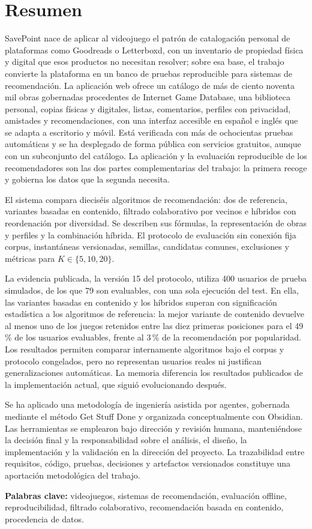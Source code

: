 \chapter*{Resumen}

SavePoint nace de aplicar al videojuego el patrón de catalogación personal de plataformas como Goodreads o Letterboxd, con un inventario de propiedad física y digital que esos productos no necesitan resolver; sobre esa base, el trabajo convierte la plataforma en un banco de pruebas reproducible para sistemas de recomendación. La aplicación web ofrece un catálogo de más de ciento noventa mil obras gobernadas procedentes de Internet Game Database, una biblioteca personal, copias físicas y digitales, listas, comentarios, perfiles con privacidad, amistades y recomendaciones, con una interfaz accesible en español e inglés que se adapta a escritorio y móvil. Está verificada con más de ochocientas pruebas automáticas y se ha desplegado de forma pública con servicios gratuitos, aunque con un subconjunto del catálogo. La aplicación y la evaluación reproducible de los recomendadores son las dos partes complementarias del trabajo: la primera recoge y gobierna los datos que la segunda necesita.

El sistema compara dieciséis algoritmos de recomendación: dos de referencia, variantes basadas en contenido, filtrado colaborativo por vecinos e híbridos con reordenación por diversidad. Se describen sus fórmulas, la representación de obras y perfiles y la combinación híbrida. El protocolo de evaluación sin conexión fija corpus, instantáneas versionadas, semillas, candidatas comunes, exclusiones y métricas para $K\in\{5,10,20\}$.

La evidencia publicada, la versión 15 del protocolo, utiliza 400 usuarios de prueba simulados, de los que 79 son evaluables, con una sola ejecución del test. En ella, las variantes basadas en contenido y los híbridos superan con significación estadística a los algoritmos de referencia: la mejor variante de contenido devuelve al menos uno de los juegos retenidos entre las diez primeras posiciones para el 49\,\% de los usuarios evaluables, frente al 3\,\% de la recomendación por popularidad. Los resultados permiten comparar internamente algoritmos bajo el corpus y protocolo congelados, pero no representan usuarios reales ni justifican generalizaciones automáticas. La memoria diferencia los resultados publicados de la implementación actual, que siguió evolucionando después.

Se ha aplicado una metodología de ingeniería asistida por agentes, gobernada mediante el método Get Stuff Done y organizada conceptualmente con Obsidian. Las herramientas se emplearon bajo dirección y revisión humana, manteniéndose la decisión final y la responsabilidad sobre el análisis, el diseño, la implementación y la validación en la dirección del proyecto. La trazabilidad entre requisitos, código, pruebas, decisiones y artefactos versionados constituye una aportación metodológica del trabajo.

\vspace{.5cm}
\textbf{Palabras clave:} videojuegos, sistemas de recomendación, evaluación offline, reproducibilidad, filtrado colaborativo, recomendación basada en contenido, procedencia de datos.
